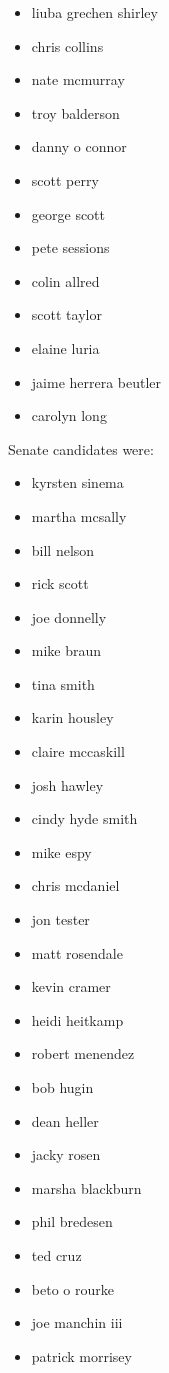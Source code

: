 \documentclass[letterpaper]{article}
\begin{document}
\begin{itemize}
    \item liuba grechen shirley
    \item chris collins
    \item nate mcmurray
    \item troy balderson
    \item danny o connor
    \item scott perry
    \item george scott
    \item pete sessions
    \item colin allred
    \item scott taylor
    \item elaine luria
    \item jaime herrera beutler
    \item carolyn long
\end{itemize}

Senate candidates were:

\begin{itemize}
    \item kyrsten sinema
    \item martha mcsally
    \item bill nelson
    \item rick scott
    \item joe donnelly
    \item mike braun
    \item tina smith
    \item karin housley
    \item claire mccaskill
    \item josh hawley
    \item cindy hyde smith
    \item mike espy
    \item chris mcdaniel
    \item jon tester
    \item matt rosendale
    \item kevin cramer
    \item heidi heitkamp
    \item robert menendez
    \item bob hugin
    \item dean heller
    \item jacky rosen
    \item marsha blackburn
    \item phil bredesen
    \item ted cruz
    \item beto o rourke
    \item joe manchin iii
    \item patrick morrisey
\end{itemize}
\end{document}
